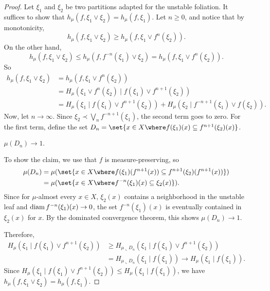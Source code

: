 \documentclass[../main]{subfiles}
\begin{document}
\begin{proof}
  Let \(\xi_1\) and \(\xi_2\) be two partitions adapted for the unstable foliation. It suffices to show that \(h_{\mu}(f, \xi_1 \vee \xi_2) = h_{\mu}(f,\xi_1)\). Let  \(n \ge 0\), and notice that by monotonicity,
  \begin{equation*}
    h_{\mu}(f, \xi_1 \vee \xi_2)\ge h_{\mu}(f, \xi_1 \vee f^n(\xi_2)).
  \end{equation*}
  On the other hand,
  \begin{equation*}
     h_{\mu}(f, \xi_1 \vee \xi_2) \le h_{\mu}(f, f^{-n}(\xi_1) \vee \xi_2) = h_{\mu}(f, \xi_1 \vee f^n(\xi_2)).
  \end{equation*}
  So
  \begin{align*}
    h_{\mu}(f, \xi_1 \vee \xi_2) &= h_{\mu}(f, \xi_1 \vee f^n(\xi_2))\\
    &= H_{\mu}(\xi_1 \vee f^n(\xi_2) \mid f(\xi_1) \vee f^{n + 1}(\xi_2))\\
    &= H_{\mu}(\xi_1 \mid f(\xi_1) \vee f^{n + 1}(\xi_2))
    +  H_{\mu}(\xi_2 \mid f^{-n + 1}(\xi_1) \vee f(\xi_2)).
  \end{align*}
  Now, let \(n \to \infty\). Since \(\xi_2 \prec \bigvee_n f^{-n + 1}(\xi_1)\), the second term goes to zero. For the first term, define the set \(D_n = \set{x \in X \where f(\xi_1)(x) \subseteq f^{n + 1}(\xi_2)(x)}\).

  \begin{claim}
    \(\mu(D_n) \to 1\).
  \end{claim}
  To show the claim, we use that \(f\) is measure-preserving, so
  \begin{align*}
    \mu(D_n) &= \mu(\set{x \in X \where f(\xi_1)(f^{n + 1}(x)) \subseteq f^{n + 1}(\xi_2)(f^{n + 1}(x))})\\
     &= \mu(\set{x \in X \where f^{-n}(\xi_1)(x) \subseteq \xi_2(x)}).
  \end{align*}
  Since for \(\mu\)-almost every \(x \in X\), \(\xi_2(x)\) contains a neighborhood in the unstable leaf and \(\operatorname{diam} f^{-n}(\xi_1)(x) \to 0\), the set \(f^{-n}(\xi_1)(x)\) is eventually contained in \(\xi_2(x)\) for \almostevery \(x\). By the dominated convergence theorem, this shows \(\mu(D_n) \to 1\).
  
  Therefore,
  \begin{align*}
    H_{\mu}(\xi_1 \mid f(\xi_1) \vee f^{n + 1}(\xi_2)) &\ge
    H_{\mu \llcorner D_n}(\xi_1 \mid f(\xi_1) \vee f^{n + 1}(\xi_2))\\ &= 
    H_{\mu \llcorner D_n}(\xi_1 \mid f(\xi_1)) \to H_{\mu}(\xi_1 \mid f(\xi_1)).
  \end{align*}
  Since \(H_{\mu}(\xi_1 \mid f(\xi_1) \vee f^{n + 1}(\xi_2)) \le H_{\mu}(\xi_1 \mid f(\xi_1))\), we have \(h_{\mu}(f, \xi_1 \vee \xi_2) = h_{\mu}(f,\xi_1)\).
\end{proof}
\end{document}
